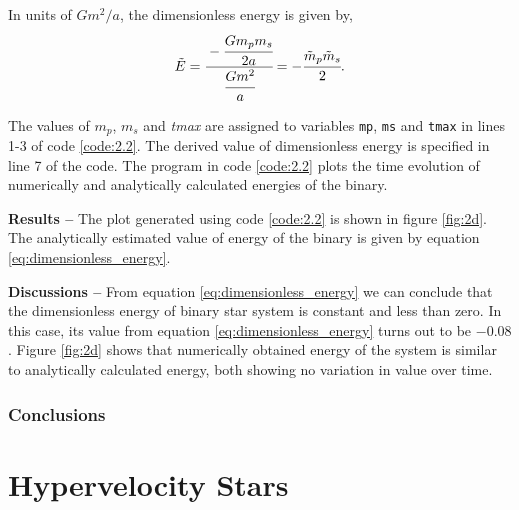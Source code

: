 \documentclass[a4paper]{article}
\begin{document}
\begin{enumerate} [label*=\textbf{(\alph*)}]
				In units of \(Gm^2/a\), the dimensionless energy is given by,
				\begin{equation}
					\tilde{E} = \cfrac{-\cfrac{G m_p m_s}{2a}}{\cfrac{G m^2}{a}} = -\cfrac{\tilde{m}_p \tilde{m}_s}{2}.
					\label{eq:dimensionless_energy}
				\end{equation}
				
				\begin{figure}
					
				\end{figure}
				
				The values of \(m_p\), \(m_s\) and \emph{tmax} are assigned to variables \texttt{mp}, \texttt{ms} and \texttt{tmax} in lines 1-3 of code \ref{code:2.2}. The derived value of dimensionless energy is specified in line 7 of the code. The program in code \ref{code:2.2} plots the time evolution of numerically and analytically calculated energies of the binary.
				
				\subitem \textbf{Results  --}
				The plot generated using code \ref{code:2.2} is shown in figure \ref{fig:2d}. The analytically estimated value of energy of the binary is given by equation \ref{eq:dimensionless_energy}.
				
				\subitem \textbf{Discussions  --}
				From equation \ref{eq:dimensionless_energy} we can conclude that the dimensionless energy of binary star system is constant and less than zero. In this case, its value from equation \ref{eq:dimensionless_energy} turns out to be \(-0.08\). Figure \ref{fig:2d} shows that numerically obtained energy of the system is similar to analytically calculated energy, both showing no variation in value over time.
			
		\end{enumerate}



		\section{Conclusions} \label{2:conclusions}


	
	\clearpage
	\setcounter{section}{0}
	\part{Hypervelocity Stars} \label{Problem3}
\end{document}
